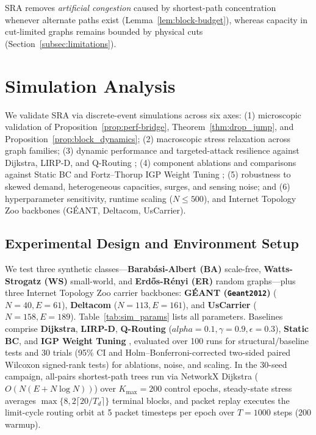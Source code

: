 \documentclass{ccjnl}
\newcommand{\rev}[1]{{\color{blue}#1}}
\def\rev#1{#1}%
\def\alpha{alpha}%
\begin{document}
\begin{remark}
SRA removes \textit{artificial congestion} caused by shortest-path concentration whenever alternate paths exist (Lemma~\ref{lem:block-budget}), whereas capacity in cut-limited graphs remains bounded by physical cuts (Section~\ref{subsec:limitations}).
\end{remark}

\section{Simulation Analysis}
\label{sec:simulation}

We validate SRA via discrete-event simulations across six axes: (1) microscopic validation of Proposition~\ref{prop:perf-bridge}, Theorem~\ref{thm:drop_jump}, and Proposition~\ref{prop:block_dynamics}; (2) macroscopic stress relaxation across graph families; (3) dynamic performance and targeted-attack resilience against Dijkstra, LIRP-D, and Q-Routing \cite{Dou2020QLearningRouting}; \rev{(4) component ablations and comparisons against Static BC and Fortz--Thorup IGP Weight Tuning \cite{Fortz2000OSPF}; (5) robustness to skewed demand, heterogeneous capacities, surges, and sensing noise; and (6) hyperparameter sensitivity, runtime scaling ($N \le 500$), and Internet Topology Zoo backbones \cite{Knight2011TopologyZoo} (G\'EANT, Deltacom, UsCarrier).}

\subsection{Experimental Design and Environment Setup}
\label{subsec:sim_setup}

We test three synthetic classes—\textbf{Barabási-Albert (BA)} scale-free, \textbf{Watts-Strogatz (WS)} small-world, and \textbf{Erd\H{o}s-Rényi (ER)} random graphs—\rev{plus three Internet Topology Zoo \cite{Knight2011TopologyZoo} carrier backbones: \textbf{G\'EANT (\texttt{Geant2012})} ($N=40, E=61$), \textbf{Deltacom} ($N=113, E=161$), and \textbf{UsCarrier} ($N=158, E=189$)}. Table~\ref{tab:sim_params} lists all parameters. Baselines comprise \textbf{Dijkstra}, \textbf{LIRP-D}, \textbf{Q-Routing} \cite{Dou2020QLearningRouting} ($\alpha=0.1, \gamma=0.9, \epsilon=0.3$), \rev{\textbf{Static BC}, and \textbf{IGP Weight Tuning} \cite{Fortz2000OSPF}}, evaluated over 100 runs for structural/baseline tests and \rev{30 trials (95\% CI and Holm--Bonferroni-corrected two-sided paired Wilcoxon signed-rank tests) for ablations, noise, and scaling. In the 30-seed campaign, all-pairs shortest-path trees run via NetworkX Dijkstra ($O(N(E+N\log N))$) over $K_{\max}=200$ control epochs, steady-state stress averages $\max\{8, 2\lceil 20/T_d\rceil\}$ terminal blocks, and packet replay executes the limit-cycle routing orbit at 5 packet timesteps per epoch over $T=1000$ steps ($200$ warmup).}
\end{document}
